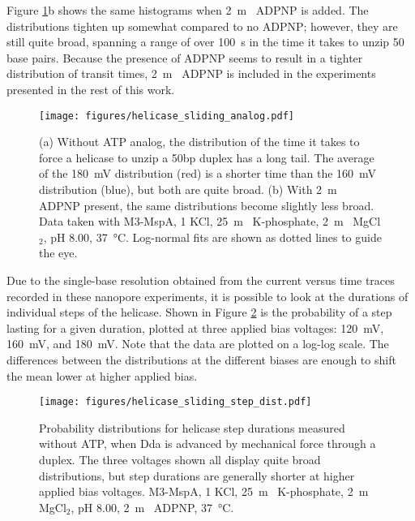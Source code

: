 Figure \ref{fig:helicase_sliding_analog}b shows the same histograms when \SI{2}{\m\Molar} ADPNP is added.  The distributions tighten up somewhat compared to no ADPNP; however, they are still quite broad, spanning a range of over \SI{100}{\s} in the time it takes to unzip \num{50} base pairs.  Because the presence of ADPNP seems to result in a tighter distribution of transit times, \SI{2}{\m\Molar} ADPNP is included in the experiments presented in the rest of this work.

\begin{figure}[H]
\begin{centering}
\texttt{[image: figures/helicase\_sliding\_analog.pdf]}
\caption[Forced unzipping time depends on the presence of an ATP analog]{(a) Without ATP analog, the distribution of the time it takes to force a helicase to unzip a \num{50}bp duplex has a long tail.  The average of the \SI{180}{\mV} distribution (red) is a shorter time than the \SI{160}{\mV} distribution (blue), but both are quite broad.  (b) With \SI{2}{\m\Molar} ADPNP present, the same distributions become slightly less broad.  Data taken with M3-MspA, \SI{1}{\Molar} KCl, \SI{25}{\m\Molar} K-phosphate, \SI{2}{\m\Molar} MgCl$_2$, pH \num{8.00}, \SI{37}{\celsius}.  Log-normal fits are shown as dotted lines to guide the eye.}
\label{fig:helicase_sliding_analog}
\end{centering}
\end{figure}

Due to the single-base resolution obtained from the current versus time traces recorded in these nanopore experiments, it is possible to look at the durations of individual steps of the helicase.  Shown in Figure \ref{fig:helicase_sliding_time_dist} is the probability of a step lasting for a given duration, plotted at three applied bias voltages: \SI{120}{\mV}, \SI{160}{\mV}, and \SI{180}{\mV}.  Note that the data are plotted on a log-log scale.  The differences between the distributions at the different biases are enough to shift the mean lower at higher applied bias.

\begin{figure}[h]
\begin{centering}
\texttt{[image: figures/helicase\_sliding\_step\_dist.pdf]}
\caption[Distribution of step durations using mechanical force]{Probability distributions for helicase step durations measured without ATP, when Dda is advanced by mechanical force through a duplex.  The three voltages shown all display quite broad distributions, but step durations are generally shorter at higher applied bias voltages.  M3-MspA, \SI{1}{\Molar} KCl, \SI{25}{\m\Molar} K-phosphate, \SI{2}{\m\Molar} MgCl$_2$, pH \num{8.00}, \SI{2}{\m\Molar} ADPNP, \SI{37}{\celsius}.}
\label{fig:helicase_sliding_time_dist}
\end{centering}
\end{figure}

